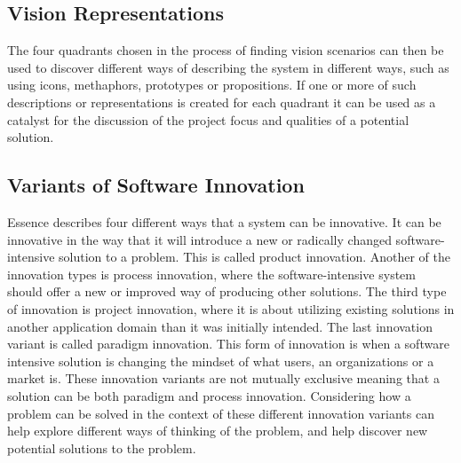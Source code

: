 \subsection{Vision Representations}
\label{sub:vision_representations}

The four quadrants chosen in the process of finding vision scenarios can then be used to discover different ways of describing the system in different ways, such as using icons, methaphors, prototypes or propositions. If one or more of such descriptions or representations is created for each quadrant it can be used as a catalyst for the discussion of the project focus and qualities of a potential solution. 

\subsection{Variants of Software Innovation}
\label{sub:essence_innovation_variants}

Essence describes four different ways that a system can be innovative. It can be innovative in the way that it will introduce a new or radically changed software-intensive solution to a problem. This is called product innovation. Another of the innovation types is process innovation, where the software-intensive system should offer a new or improved way of producing other solutions. The third type of innovation is project innovation, where it is about utilizing existing solutions in another application domain than it was initially intended. The last innovation variant is called paradigm innovation. This form of innovation is when a software intensive solution is changing the mindset of what users, an organizations or a market is. These innovation variants are not mutually exclusive meaning that a solution can be both paradigm and process innovation. Considering how a problem can be solved in the context of these different innovation variants can help explore different ways of thinking of the problem, and help discover new potential solutions to the problem.

